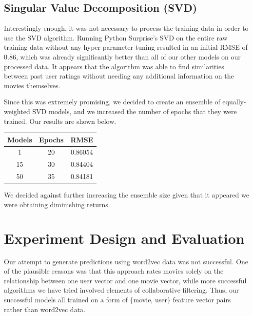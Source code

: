 \documentclass{sig-alternate-05-2015}
\begin{document}
\subsection{Singular Value Decomposition (SVD)}

Interestingly enough, it was not necessary to process the training data in order to use the SVD algorithm.
Running Python Surprise's SVD on the entire raw training data without any hyper-parameter tuning resulted in an
initial RMSE of 0.86, which was already significantly better than all of our other models on our processed data.
It appears that the algorithm was able to find similarities between past user ratings without needing
any additional information on the movies themselves.

Since this was extremely promising, we decided to create an ensemble of equally-weighted SVD models, and we
increased the number of epochs that they were trained. Our results are shown below.
\begin{center}
    \begin{tabular}{c|c|c}
        Models & Epochs & RMSE\\
        \hline
        1 & 20 & 0.86054\\
        15 & 30 & 0.84404\\
        50 & 35 & 0.84181
    \end{tabular}
\end{center}

We decided against further increasing the ensemble size given that it appeared we were obtaining diminishing returns.

\section{Experiment Design and Evaluation}

Our attempt to generate predictions using word2vec data was not successful. One of the plausible reasons was that this
approach rates movies solely on the relationship between one user vector and one movie vector, while more successful
algorithms we have tried involved elements of collaborative filtering. Thus, our successful models all trained on
a form of \{movie, user\} feature vector pairs rather than word2vec data.
\end{document}
